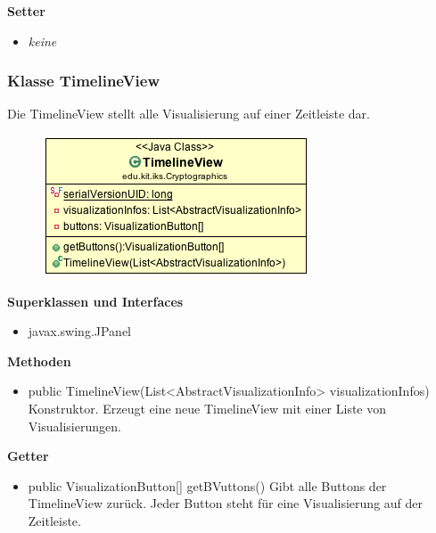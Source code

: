 \documentclass{article}
\begin{document}
      \textbf{Setter}
      \begin{itemize}
        \item \textit{keine}
      \end{itemize}

    \subsubsection{Klasse TimelineView}
      Die TimelineView stellt alle Visualisierung auf einer Zeitleiste dar.
      \begin{figure}[H]
        \centering
        \includegraphics[width=\textwidth]{resources/edu-kit-iks-Cryptographics-TimelineView}
      \end{figure}

      \textbf{Superklassen und Interfaces}
      \begin{itemize}
        \item javax.swing.JPanel
      \end{itemize}
      
      \textbf{Methoden}
      \begin{itemize}
        \item public TimelineView(List<AbstractVisualizationInfo> visualizationInfos) \newline
        Konstruktor. Erzeugt eine neue TimelineView mit einer Liste von Visualisierungen.
      \end{itemize}

      \textbf{Getter}
      \begin{itemize}
        \item public VisualizationButton[] getBVuttons() \newline
        Gibt alle Buttons der TimelineView zurück. Jeder Button steht für eine Visualisierung auf der Zeitleiste.
      \end{itemize}
\end{document}
